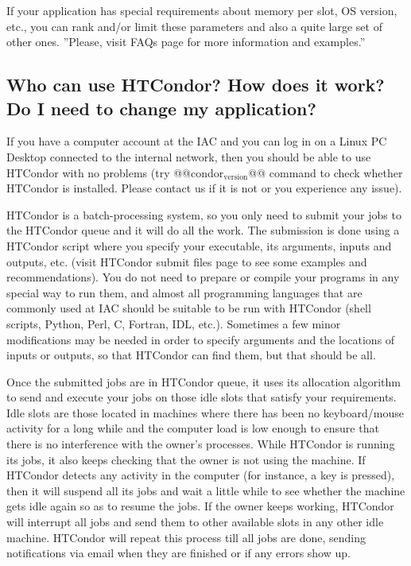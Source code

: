 \documentclass[a4paper,10pt]{article}
\begin{document}
If your application has special requirements about memory per slot, OS version,
etc., you can rank and/or limit these parameters and also a quite large set of
other ones. ''Please, visit FAQs page for more information and
examples.''


\subsection{Who can use HTCondor? How does it work?  Do I need to change my application?}
\label{sec:orgad47c72}

If you have a computer account at the IAC and you can log in on a Linux PC
Desktop connected to the internal network, then you should be able to use
HTCondor with no problems (try @@condor\(_{\text{version}}\)@@ command to check whether
HTCondor is installed. Please contact us if it is not or you experience any
issue).

HTCondor is a batch-processing system, so you only need to submit your jobs to
the HTCondor queue and it will do all the work. The submission is done using a
HTCondor script where you specify your executable, its arguments, inputs and
outputs, etc. (visit HTCondor submit files page to see some
examples and recommendations). You do not need to prepare or compile your
programs in any special way to run them, and almost all programming languages
that are commonly used at IAC should be suitable to be run with HTCondor (shell
scripts, Python, Perl, C, Fortran, IDL, etc.). Sometimes a few minor
modifications may be needed in order to specify arguments and the locations of
inputs or outputs, so that HTCondor can find them, but that should be all.

Once the submitted jobs are in HTCondor queue, it uses its allocation algorithm
to send and execute your jobs on those idle slots that satisfy your
requirements. Idle slots are those located in machines where there has been no
keyboard/mouse activity for a long while and the computer load is low enough to
ensure that there is no interference with the owner's processes. While HTCondor
is running its jobs, it also keeps checking that the owner is not using the
machine. If HTCondor detects any activity in the computer (for instance, a key
is pressed), then it will suspend all its jobs and wait a little while to see
whether the machine gets idle again so as to resume the jobs. If the owner keeps
working, HTCondor will interrupt all jobs and send them to other available slots
in any other idle machine. HTCondor will repeat this process till all jobs are
done, sending notifications via email when they are finished or if any errors
show up.
\end{document}
